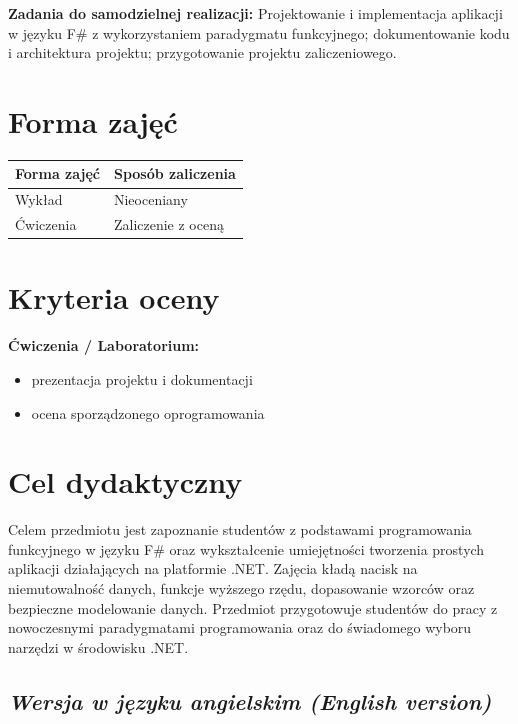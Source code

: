 \documentclass[12pt, a4paper]{article}
\newcommand{\thdrule}{\noalign{\global\setlength{\extrarowheight}{0pt}}}
\newcommand{\thdend}{\noalign{\global\setlength{\extrarowheight}{3pt}}}
\begin{document}
\vspace{4pt}
\noindent\textbf{Zadania do samodzielnej realizacji:} Projektowanie i implementacja aplikacji w języku F\# z wykorzystaniem paradygmatu funkcyjnego; dokumentowanie kodu i architektura projektu; przygotowanie projektu zaliczeniowego.

\section{Forma zajęć}

\begin{center}
{\scriptsize
\begin{tabular}{m{5cm}m{8cm}}
\thdrule\toprule
\rowcolor{pjatkRed} {\color{white}\textbf{Forma zajęć}} & {\color{white}\textbf{Sposób zaliczenia}} \\
\midrule\thdend
  \rowcolor{tableRowLight} Wykład & Nieoceniany \\
  \rowcolor{tableRowAlt} Ćwiczenia & Zaliczenie z oceną \\
\bottomrule
\end{tabular}}
\end{center}

\section{Kryteria oceny}

\textbf{Ćwiczenia / Laboratorium:}
\begin{itemize}
  \item prezentacja projektu i dokumentacji
  \item ocena sporządzonego oprogramowania
\end{itemize}


\section{Cel dydaktyczny}

Celem przedmiotu jest zapoznanie studentów z podstawami programowania funkcyjnego w języku F\# oraz wykształcenie umiejętności tworzenia prostych aplikacji działających na platformie .NET. Zajęcia kładą nacisk na niemutowalność danych, funkcje wyższego rzędu, dopasowanie wzorców oraz bezpieczne modelowanie danych. Przedmiot przygotowuje studentów do pracy z nowoczesnymi paradygmatami programowania oraz do świadomego wyboru narzędzi w środowisku .NET.

\subsection*{\textit{Wersja w języku angielskim (English version)}}
\end{document}
